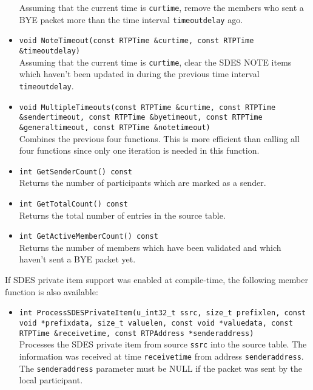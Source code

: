 \documentclass[12pt,a4paper]{article}
\begin{document}
\begin{itemize}
						Assuming that the current time is {\tt curtime}, remove the
						members who sent a BYE packet more than the time interval
						{\tt timeoutdelay} ago.
					\item {\tt void NoteTimeout(const RTPTime \&curtime, const RTPTime \&timeoutdelay)}\\
						Assuming that the current time is {\tt curtime}, clear the SDES 
						NOTE items which haven't been updated in during the previous
						time interval {\tt timeoutdelay}.
					\item {\tt void MultipleTimeouts(const RTPTime \&curtime, const RTPTime \&sendertimeout,
					                                 const RTPTime \&byetimeout, const RTPTime \&generaltimeout,
					                                 const RTPTime \&notetimeout)}\\
						Combines the previous four functions. This is more efficient
						than calling all four functions since only one iteration
						is needed in this function.
					\item {\tt int GetSenderCount() const}\\
						Returns the number of participants which are marked as a
						sender.
					\item {\tt int GetTotalCount() const}\\
						Returns the total number of entries in the source table.
					\item {\tt int GetActiveMemberCount() const}\\
						Returns the number of members which have been validated and
						which haven't sent a BYE packet yet.
				\end{itemize}
				
				If SDES private item support was enabled at compile-time, the following
				member function is also available: 
				\begin{itemize}
					\item {\tt int ProcessSDESPrivateItem(u\_int32\_t ssrc, size\_t prefixlen, const void *prefixdata,
	                                                      size\_t valuelen, const void *valuedata, const RTPTime \&receivetime,
					                                      const RTPAddress *senderaddress)}\\
						Processes the SDES private item from source {\tt ssrc}
						into the source table. The information was received at
						time {\tt receivetime} from address {\tt senderaddress}.
						The {\tt senderaddress} parameter must be NULL if the
						packet was sent by the local participant.
				\end{itemize}
\end{document}
